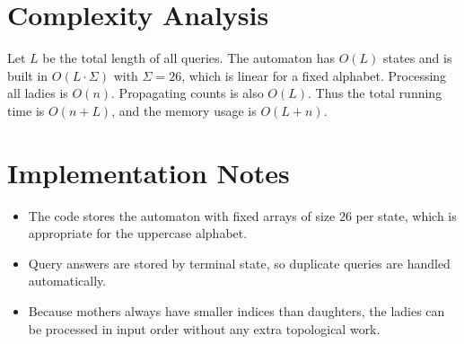 \documentclass[11pt]{article}
\begin{document}
\section*{Complexity Analysis}

Let $L$ be the total length of all queries. The automaton has $O(L)$ states and is built in $O(L \cdot \Sigma)$ with $\Sigma = 26$, which is linear for a fixed alphabet. Processing all ladies is $O(n)$. Propagating counts is also $O(L)$. Thus the total running time is $O(n + L)$, and the memory usage is $O(L + n)$.

\section*{Implementation Notes}

\begin{itemize}[leftmargin=*]
    \item The code stores the automaton with fixed arrays of size $26$ per state, which is appropriate for the uppercase alphabet.
    \item Query answers are stored by terminal state, so duplicate queries are handled automatically.
    \item Because mothers always have smaller indices than daughters, the ladies can be processed in input order without any extra topological work.
\end{itemize}
\end{document}
